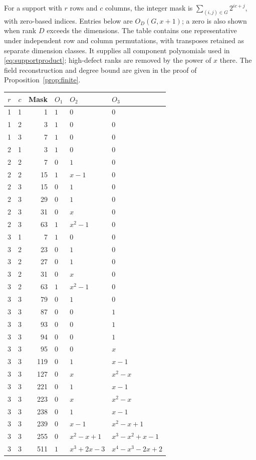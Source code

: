 \documentclass[11pt]{article}
\begin{document}
For a support with $r$ rows and $c$ columns, the integer mask is
$\sum_{(i,j)\in G}2^{ic+j}$, with zero-based indices. Entries below are
$O_D(G,x+1)$; a zero is also shown when rank $D$ exceeds the dimensions.
The table contains one representative under independent row and column
permutations, with transposes retained as separate dimension classes.
It supplies all component polynomials used in
\eqref{eq:supportproduct}; high-defect ranks are removed by the power
of $x$ there. The field reconstruction and degree bound are given in
the proof of Proposition~\ref{prop:finite}.

\begin{longtable}{ccrlll}
\toprule
$r$ & $c$ & Mask & $O_1$ & $O_2$ & $O_3$\\
\midrule
\endhead
1 & 1 & 1 & $1$ & $0$ & $0$\\
1 & 2 & 3 & $1$ & $0$ & $0$\\
1 & 3 & 7 & $1$ & $0$ & $0$\\
2 & 1 & 3 & $1$ & $0$ & $0$\\
2 & 2 & 7 & $0$ & $1$ & $0$\\
2 & 2 & 15 & $1$ & $x-1$ & $0$\\
2 & 3 & 15 & $0$ & $1$ & $0$\\
2 & 3 & 29 & $0$ & $1$ & $0$\\
2 & 3 & 31 & $0$ & $x$ & $0$\\
2 & 3 & 63 & $1$ & $x^{2}-1$ & $0$\\
3 & 1 & 7 & $1$ & $0$ & $0$\\
3 & 2 & 23 & $0$ & $1$ & $0$\\
3 & 2 & 27 & $0$ & $1$ & $0$\\
3 & 2 & 31 & $0$ & $x$ & $0$\\
3 & 2 & 63 & $1$ & $x^{2}-1$ & $0$\\
3 & 3 & 79 & $0$ & $1$ & $0$\\
3 & 3 & 87 & $0$ & $0$ & $1$\\
3 & 3 & 93 & $0$ & $0$ & $1$\\
3 & 3 & 94 & $0$ & $0$ & $1$\\
3 & 3 & 95 & $0$ & $0$ & $x$\\
3 & 3 & 119 & $0$ & $1$ & $x-1$\\
3 & 3 & 127 & $0$ & $x$ & $x^{2}-x$\\
3 & 3 & 221 & $0$ & $1$ & $x-1$\\
3 & 3 & 223 & $0$ & $x$ & $x^{2}-x$\\
3 & 3 & 238 & $0$ & $1$ & $x-1$\\
3 & 3 & 239 & $0$ & $x-1$ & $x^{2}-x+1$\\
3 & 3 & 255 & $0$ & $x^{2}-x+1$ & $x^{3}-x^{2}+x-1$\\
3 & 3 & 511 & $1$ & $x^{3}+2x-3$ & $x^{4}-x^{3}-2x+2$\\
\bottomrule
\end{longtable}

\clearpage


\end{document}
